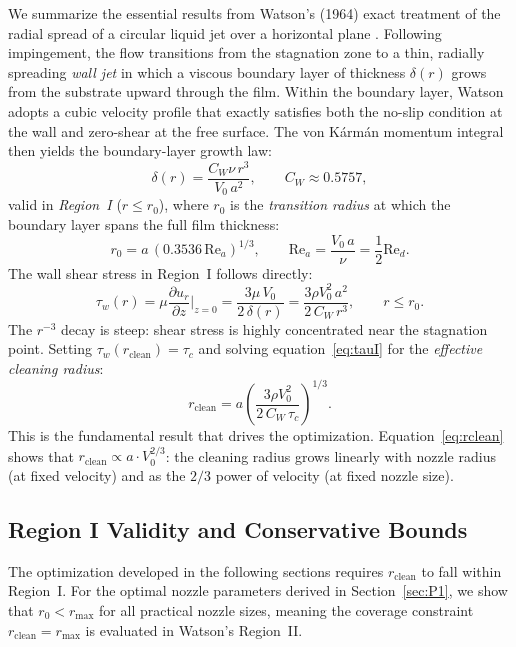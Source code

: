 \documentclass[aps,prfluids,reprint,amsmath,amssymb,floatfix]{revtex4-2}
\newcommand{\Rey}{\mathrm{Re}}
\begin{document}
We summarize the essential results from Watson's (1964) exact treatment
of the radial spread of a circular liquid jet over a horizontal plane
\citep{Watson1964}. Following impingement, the flow transitions from the
stagnation zone to a thin, radially spreading \emph{wall jet} in which a
viscous boundary layer of thickness $\delta(r)$ grows from the substrate
upward through the film. Within the boundary layer, Watson adopts a
cubic velocity profile that exactly satisfies both the no-slip condition
at the wall and zero-shear at the free surface. The von K\'{a}rm\'{a}n
momentum integral then yields the boundary-layer growth law:
\begin{equation}
  \delta(r) = \frac{C_W \nu\,r^3}{V_0\,a^2},
  \qquad C_W \approx 0.5757,
  \label{eq:deltawatson}
\end{equation}
valid in \emph{Region~I} ($r \leq r_0$), where $r_0$ is the
\emph{transition radius} at which the boundary layer spans the full
film thickness:
\begin{equation}
  r_0 = a\,(0.3536\,\Rey_a)^{1/3}, \qquad
  \Rey_a = \frac{V_0\,a}{\nu} = \frac{1}{2}\Rey_d.
  \label{eq:r0}
\end{equation}
The wall shear stress in Region~I follows directly:
\begin{equation}
  \tau_w(r) = \mu \frac{\partial u_r}{\partial z}\bigg|_{z=0}
  = \frac{3\mu\,V_0}{2\,\delta(r)}
  = \frac{3\rho V_0^2\,a^2}{2\,C_W\,r^3},
  \qquad r \leq r_0.
  \label{eq:tauI}
\end{equation}
The $r^{-3}$ decay is steep: shear stress is highly concentrated near the
stagnation point. Setting $\tau_w(r_\mathrm{clean}) = \tau_c$ and solving
equation~\eqref{eq:tauI} for the \emph{effective cleaning radius}:
\begin{equation}
  r_\mathrm{clean} = a \left(\frac{3\rho V_0^2}{2\,C_W\,\tau_c}\right)^{1/3}.
  \label{eq:rclean}
\end{equation}
This is the fundamental result that drives the optimization.
Equation~\eqref{eq:rclean} shows that $r_\mathrm{clean} \propto a \cdot V_0^{2/3}$:
the cleaning radius grows linearly with nozzle radius (at fixed velocity)
and as the $2/3$ power of velocity (at fixed nozzle size).

\subsection{Region I Validity and Conservative Bounds}
\label{subsec:validity}

The optimization developed in the following sections requires
$r_\mathrm{clean}$ to fall within Region~I. For the optimal nozzle
parameters derived in Section~\ref{sec:P1}, we show that $r_0 < r_\mathrm{max}$
for all practical nozzle sizes, meaning the coverage constraint
$r_\mathrm{clean} = r_\mathrm{max}$ is evaluated in Watson's Region~II.
\end{document}
